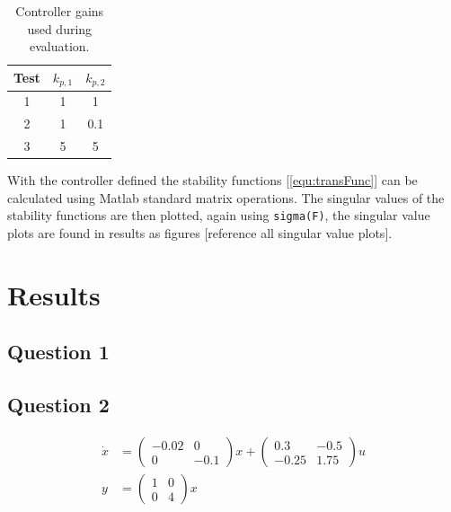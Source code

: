 \documentclass[a4paper, titlepage]{article}
\begin{document}
\begin{table}[h!]
\begin{center}
\begin{tabular}{||c | c c||}
 \hline
 Test & $k_{p,1}$ & $k_{p,2}$ \\ [0.5ex] 
 \hline\hline
 1 &  1 & 1 \\ 
 \hline
 2 &  1 & 0.1 \\
 \hline
 3 &  5 & 5 \\
 \hline
\end{tabular}
\end{center}
\caption{Controller gains used during evaluation.}
\label{tab:gains}
\end{table}

With the controller defined the stability functions [\ref{equ:transFunc}] can be calculated using Matlab standard matrix operations.
The singular values of the stability functions are then plotted, again using \verb|sigma(F)|, the singular value plots are found in results as figures [reference all singular value plots].

\section{Results}

\subsection{Question 1}

\subsection{Question 2}

\begin{equation}
\begin{split}
\dot{x} &= 
\begin{pmatrix}
-0.02 & 0 \\ 0 & -0.1
\end{pmatrix}x
+
\begin{pmatrix}
0.3 & -0.5 \\ -0.25 & 1.75
\end{pmatrix}u \\
y &= 
\begin{pmatrix}
1 & 0 \\ 0 & 4
\end{pmatrix}x
\end{split}
\label{equ:ssSolution}
\end{equation}
\end{document}
